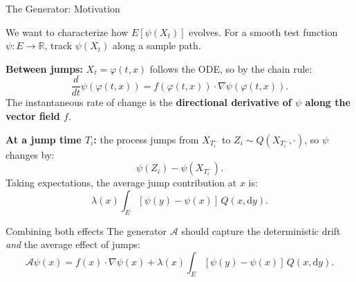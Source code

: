 \documentclass[aspectratio=169]{beamer}
\begin{document}
\begin{frame}{The Generator: Motivation}

  We want to characterize how $E[\psi(X_t)]$ evolves. For a smooth test
  function $\psi: E \to \mathbb{R}$, track $\psi(X_t)$ along a sample path.

  \bigskip
  \textbf{Between jumps:} $X_t = \varphi(t,x)$ follows the ODE, so by the
  chain rule:
  \[
    \frac{d}{dt}\psi(\varphi(t,x)) = f(\varphi(t,x))\cdot\nabla\psi(\varphi(t,x)).
  \]
  The instantaneous rate of change is the \textbf{directional derivative of
  $\psi$ along the vector field $f$}.

  \bigskip
  \textbf{At a jump time $T_i$:} the process jumps from $X_{T_i^-}$ to
  $Z_i \sim Q(X_{T_i^-}, \cdot)$, so $\psi$ changes by:
  \[
    \psi(Z_i) - \psi(X_{T_i^-}).
  \]
  Taking expectations, the average jump contribution at $x$ is:
  \[
    \lambda(x)\int_E [\psi(y) - \psi(x)]\,Q(x,\mathrm{d}y).
  \]

  \bigskip
  \begin{block}{Combining both effects}
    The generator $\mathcal{A}$ should capture the deterministic drift
    \emph{and} the average effect of jumps:
    \[
      \mathcal{A}\psi(x) = f(x)\cdot\nabla\psi(x)
      + \lambda(x)\int_E[\psi(y)-\psi(x)]\,Q(x,\mathrm{d}y).
    \]
  \end{block}

\end{frame}
\end{document}
